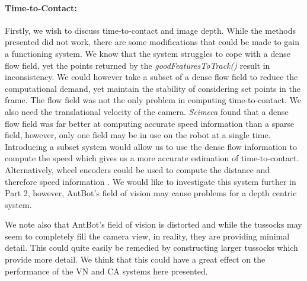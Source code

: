 \documentclass[a4paper,11pt,twoside,openright]{article}
\begin{document}
\paragraph{Time-to-Contact:}
Firstly, we wish to discuss time-to-contact and image depth. While the methods presented did not work, there are
some modifications that could be made to gain a functioning system. We know that the system struggles to cope
with a dense flow field, yet the points returned by the \textit{goodFeaturesToTrack()} result in inconsistency. We
could however take a subset of a dense flow field to reduce the computational demand, yet maintain the stability of
considering set points in the frame. The flow field was not the only problem in computing time-to-contact. We also
need the translational velocity of the camera. \textit{Scimeca} found that a dense flow field was far better at
computing accurate speed information than a sparse field, however, only one field may be in use on the robot at
a single time. Introducing a subset system would allow us to use the dense flow information to compute the speed
which gives us a more accurate estimation of time-to-contact. Alternatively, wheel encoders could be used to compute the
distance and therefore speed information \cite{Wittlinger1965}. We would like to investigate this system
further in Part 2, however, AntBot's field of vision may cause problems for a depth centric system.
\newline

We note also that AntBot's field of vision is distorted and while the tussocks may seem to completely
fill the camera view, in reality, they are providing minimal detail. This could quite easily be remedied by
constructing larger tussocks which provide more detail. We think that this could have a great effect on the
performance of the VN and CA systems here presented.
\newline
\end{document}
